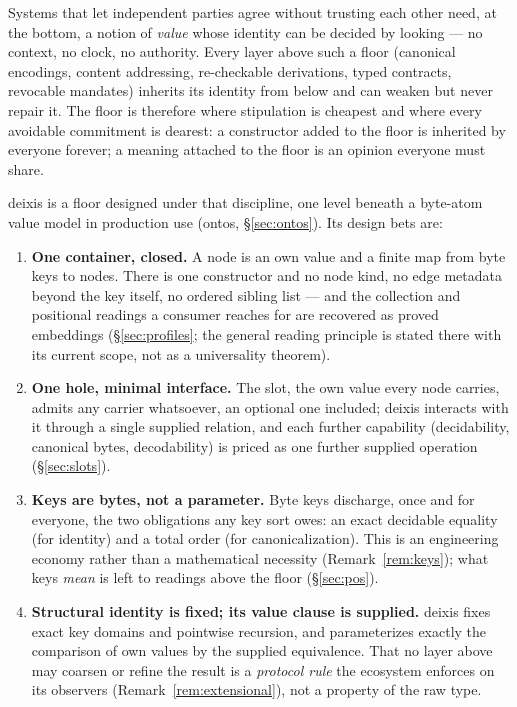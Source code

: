\documentclass[11pt]{article}
\theoremstyle{definition}
\begin{document}
Systems that let independent parties agree without trusting each other need, at the
bottom, a notion of \emph{value} whose identity can be decided by looking --- no
context, no clock, no authority. Every layer above such a floor (canonical encodings,
content addressing, re-checkable derivations, typed contracts, revocable mandates)
inherits its identity from below and can weaken but never repair it. The floor is
therefore where stipulation is cheapest and where every avoidable commitment is
dearest: a constructor added to the floor is inherited by everyone forever; a meaning
attached to the floor is an opinion everyone must share.

deixis is a floor designed under that discipline, one level beneath a byte-atom value
model in production use (ontos, \S\ref{sec:ontos}). Its design bets are:

\begin{enumerate}[leftmargin=1.6em]
\item \textbf{One container, closed.} A node is an own value and a finite map from byte
  keys to nodes. There is one constructor and no node kind, no edge metadata
  beyond the key itself, no ordered sibling list --- and the collection and positional readings a consumer
  reaches for are recovered as proved embeddings (\S\ref{sec:profiles}; the general
  reading principle is stated there with its current scope, not as a universality
  theorem).
\item \textbf{One hole, minimal interface.} The slot, the own value every node carries,
  admits any carrier whatsoever, an optional one included; deixis interacts with it through a single supplied relation, and each
  further capability (decidability, canonical bytes, decodability) is priced as one
  further supplied operation (\S\ref{sec:slots}).
\item \textbf{Keys are bytes, not a parameter.} Byte keys discharge, once and for
  everyone, the two obligations any key sort owes: an exact decidable equality (for
  identity) and a total order (for canonicalization). This is an engineering economy
  rather than a mathematical necessity (Remark~\ref{rem:keys}); what keys \emph{mean}
  is left to readings above the floor (\S\ref{sec:pos}).
\item \textbf{Structural identity is fixed; its value clause is supplied.} deixis
  fixes exact key domains and pointwise recursion, and parameterizes exactly the
  comparison of own values by the supplied equivalence. That no layer above
  may coarsen or refine the result is a \emph{protocol rule} the ecosystem enforces on
  its observers (Remark~\ref{rem:extensional}), not a property of the raw type.
\end{enumerate}
\end{document}
